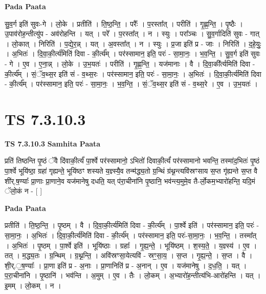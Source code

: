 \documentclass[17pt]{extarticle}
\begin{document}
\textbf{Pada Paata} \newline

सु॒व॒र्ग इति॑ सुवः-गे । लो॒के । प्रतीति॑ । ति॒ष्ठ॒न्ति॒ । परैः᳚ । प॒रस्ता᳚त् । परीति॑ । गृ॒ह्ण॒न्ति॒ । पृ॒ष्ठैः । उ॒पाव॑रोह॒न्तीत्यु॑प - अव॑रोहन्ति । यत् । परे᳚ । प॒रस्ता᳚त् । न । स्युः । परा᳚ञ्चः । सु॒व॒र्गादिति॑ सुवः - गात् । लो॒कात् । निरिति॑ । प॒द्ये॒र॒न्न् । यत् । अ॒वस्ता᳚त् । न । स्युः । प्र॒जा इति॑ प्र - जाः । निरिति॑ । द॒हे॒युः॒ । अ॒भितः॑ । दि॒वा॒की॒र्त्य॑मिति॑ दिवा - की॒र्त्य᳚म् । पर॑स्सामान॒ इति॒ परः॑ - सा॒मा॒नः॒ । भ॒व॒न्ति॒ । सु॒व॒र्ग इति॑ सुवः - गे । ए॒व । ए॒ना॒न्न् । लो॒के । उ॒भ॒यतः॑ । परीति॑ । गृ॒ह्ण॒न्ति॒ । यज॑मानाः । वै । दि॒वा॒की᳚र्त्यमिति॑ दिवा - की॒र्त्य᳚म् । सं॒ॅव॒थ्स॒र इति॑ सं - व॒थ्स॒रः । पर॑स्सामान॒ इति॒ परः॑ - सा॒मा॒नः॒ । अ॒भितः॑ । दि॒वा॒की॒र्त्य॑मिति॑ दिवा - की॒र्त्य᳚म् । पर॑स्सामान॒ इति॒ परः॑ - सा॒मा॒नः॒ । भ॒व॒न्ति॒ । सं॒ॅव॒थ्स॒र इति॑ सं - व॒थ्स॒रे । ए॒व । उ॒भ॒यतः॑ ।  \newline




\section*{ TS 7.3.10.3 }

\textbf{TS 7.3.10.3 } \newline
\textbf{Samhita Paata} \newline

प्रति॑ तिष्ठन्ति पृ॒ष्ठं ॅवै दि॑वाकी॒र्त्यं॑ पा॒र्श्वे पर॑स्सामानो॒ ऽभितो॑ दिवाकी॒र्त्यं॑ पर॑स्सामानो भवन्ति॒ तस्मा॑द॒भितः॑ पृ॒ष्ठं पा॒र्श्वे भूयि॑ष्ठा॒ ग्रहा॑ गृह्यन्ते॒ भूयि॑ष्ठꣳ शस्यते य॒ज्ञ्स्यै॒व तन्म॑द्ध्य॒तो ग्र॒न्थिं ग्र॑थ्न॒न्त्यवि॑स्रꣳसाय स॒प्त गृ॑ह्यन्ते स॒प्त वै शी॑र्.ष॒ण्याः᳚ प्रा॒णाः प्रा॒णाने॒व यज॑मानेषु दधति॒ यत् प॑रा॒चीना॑नि पृ॒ष्ठानि॒ भव॑न्त्य॒मुमे॒व तै-र्लो॒कम॒भ्यारो॑हन्ति॒ यदि॒मं ॅलो॒कं न - [  ] \newline

\textbf{Pada Paata} \newline

प्रतीति॑ । ति॒ष्ठ॒न्ति॒ । पृ॒ष्ठम् । वै । दि॒वा॒की॒र्त्य॑मिति॑ दिवा - की॒र्त्य᳚म् । पा॒र्श्वे इति॑ । पर॑स्सामान॒ इति॒ परः॑ - सा॒मा॒नः॒ । अ॒भितः॑ । दि॒वा॒की॒र्त्य॑मिति॑ दिवा - की॒र्त्य᳚म् । पर॑स्सामान॒ इति॒ परः॑-सा॒मा॒नः॒ । भ॒व॒न्ति॒ । तस्मा᳚त् । अ॒भितः॑ । पृ॒ष्ठम् । पा॒र्श्वे इति॑ । भूयि॑ष्ठाः । ग्रहाः᳚ । गृ॒ह्य॒न्ते॒ । भूयि॑ष्ठम् । श॒स्य॒ते॒ । य॒ज्ञ्स्य॑ । ए॒व । तत् । म॒द्ध्य॒तः । ग्र॒न्थिम् । ग्र॒थ्न॒न्ति॒ । अवि॑स्रꣳसा॒येत्यवि॑ - स्रꣳ॒॒सा॒य॒ । स॒प्त । गृ॒ह्य॒न्ते॒ । स॒प्त । वै । शी॒र्.॒ष॒ण्याः᳚ । प्रा॒णा इति॑ प्र - अ॒नाः । प्रा॒णानिति॑ प्र - अ॒नान् । ए॒व । यज॑मानेषु । द॒ध॒ति॒ । यत् । प॒रा॒चीना॑नि । पृ॒ष्ठानि॑ । भव॑न्ति । अ॒मुम् । ए॒व । तैः । लो॒कम् । अ॒भ्यारो॑ह॒न्तीत्य॑भि-आरो॑हन्ति । यत् । इ॒मम् । लो॒कम् । न ।  \newline
\end{document}
